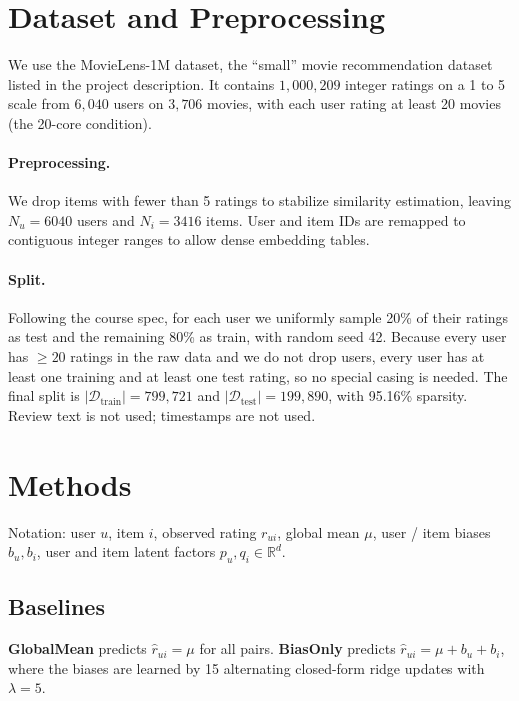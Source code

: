 \documentclass[sigconf,nonacm]{acmart}
\begin{document}
\section{Dataset and Preprocessing}
We use the MovieLens-1M dataset, the ``small'' movie recommendation dataset
listed in the project description. It contains $1{,}000{,}209$ integer
ratings on a 1 to 5 scale from $6{,}040$ users on $3{,}706$ movies, with each
user rating at least 20 movies (the 20-core condition).

\paragraph{Preprocessing.} We drop items with fewer than 5 ratings to
stabilize similarity estimation, leaving $N_u{=}6040$ users and
$N_i{=}3416$ items. User and item IDs are remapped to contiguous integer
ranges to allow dense embedding tables.

\paragraph{Split.} Following the course spec, for each user we uniformly
sample 20\% of their ratings as test and the remaining 80\% as train, with
random seed 42. Because every user has $\ge 20$ ratings in the raw data and
we do not drop users, every user has at least one training and at least one
test rating, so no special casing is needed. The final split is
$|\mathcal{D}_{\text{train}}|{=}799{,}721$ and
$|\mathcal{D}_{\text{test}}|{=}199{,}890$, with 95.16\% sparsity. Review
text is not used; timestamps are not used.

\section{Methods}
Notation: user $u$, item $i$, observed rating $r_{ui}$, global mean $\mu$,
user / item biases $b_u, b_i$, user and item latent factors
$p_u, q_i \in \mathbb{R}^d$.

\subsection{Baselines}
\textbf{GlobalMean} predicts $\hat{r}_{ui} = \mu$ for all pairs.
\textbf{BiasOnly} predicts $\hat{r}_{ui} = \mu + b_u + b_i$, where the
biases are learned by 15 alternating closed-form ridge updates with
$\lambda = 5$.
\end{document}
